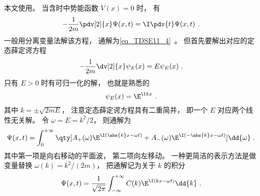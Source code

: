

本文使用。 当含时中势能函数 $V(x) = 0$ 时， 有
\begin{equation}\label{eq_FreeP1_1}
-\frac{1}{2m}\pdv[2]{x}\Psi(x,t) = \I \pdv{t} \Psi(x,t)~.
\end{equation}
一般用分离变量法解该方程， 通解为\autoref{eq_TDSE11_4}~。 但首先要解出对应的定态薛定谔方程
\begin{equation}
-\frac{1}{2m}\dv[2]{x}\psi_E(x) = E \psi_E(x)~.
\end{equation}
只有 $E > 0$ 时有可归一化的解， 也就是熟悉的
\begin{equation}
\psi_E(x) = \E^{\I k x}~.
\end{equation}
其中 $k = \pm\sqrt{2mE}$， 注意定态薛定谔方程具有二重简并， 即一个 $E$ 对应两个线性无关解。 令 $\omega = E = k^2/2$， 则通解为
\begin{equation}\label{eq_FreeP1_2}
\Psi(x,t) = \int_{0}^{+\infty} \qty[A_+(\omega) \E^{\I (\abs{k}x - \omega t)} + A_-(\omega) \E^{\I (-\abs{k}x - \omega t)}] \dd{\omega}~.
\end{equation}
其中第一项是向右移动的平面波， 第二项向左移动。 一种更简洁的表示方法是做变量替换 $\omega(k) = k^2/(2m)$， 把通解记为关于 $k$ 的积分
\begin{equation}\label{eq_FreeP1_3}
\Psi(x,t) = \frac{1}{\sqrt{2\pi}} \int_{-\infty}^{+\infty} C(k) \E^{\I (k x - \omega t)} \dd{k}~.
\end{equation}
